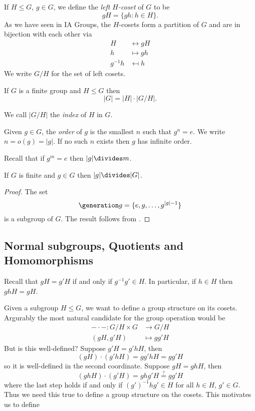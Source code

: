 \documentclass[a4paper]{article}
\theoremstyle{definition}
\begin{document}
If \(H \leq G\), \(g \in G\), we define the \emph{left \(H\)-coset} of \(G\) to be
\[
  gH = \{gh: h \in H\}.
\]
As we have seen in IA Groups, the \(H\)-cosets form a partition of \(G\) and are in bijection with each other via
\begin{align*}
  H &\leftrightarrow gH \\
  h &\mapsto gh \\
  g^{-1}h &\mapsfrom h
\end{align*}
We write \(G/H\) for the set of left cosets.

\begin{theorem}[Lagrange]
  \label{thm:lagrange}
  If \(G\) is a finite group and \(H \leq G \) then
  \[
    |G| = |H| \cdot |G/H|.
  \]
\end{theorem}

We call \(|G/H|\) the \emph{index} of \(H\) in \(G\).

\begin{definition}[Order]
  Given \(g \in G\), the \emph{order} of \(g\) is the smallest \(n\) such that \(g^n = e\). We write \(n = o(g) = |g|\). If no such \(n\) exists then \(g\) has infinite order.
\end{definition}

Recall that if \(g^m = e\) then \(|g| \divides m\).

\begin{lemma}
  If \(G\) is finite and \(g \in G\) then \(|g| \divides |G|\).
\end{lemma}

\begin{proof}
  The set
  \[
    \generation g = \{e, g, \dots, g^{|g| - 1}\}
  \]
  is a subgroup of \(G\). The result follows from .
\end{proof}

\subsection{Normal subgroups, Quotients and Homomorphisms}

Recall that \(gH = g'H\) if and only if \(g^{-1}g' \in H\). In particular, if \(h \in H\) then \(ghH = gH\).

Given a subgroup \(H \leq G\), we want to define a group structure on its cosets. Argurably the most natural candidate for the group operation would be
\begin{align*}
  - \cdot -: G/H \times G &\to G/H \\
  (gH, g'H) &\mapsto gg'H
\end{align*}
But is this well-defined? Suppose \(g'H = g'hH\), then
\[
  (gH) \cdot (g'hH) = gg'hH = gg'H
\]
so it is well-defined in the second coordinate. Suppose \(gH = ghH\), then
\[
  (ghH) \cdot (g'H) = ghg' H \stackrel{?}{=} gg'H
\]
where the last step holds if and only if \((g')^{-1}hg' \in H\) for all \(h \in H\), \(g' \in G\). Thus we need this true to define a group structure on the cosets. This motivates us to define
\end{document}
